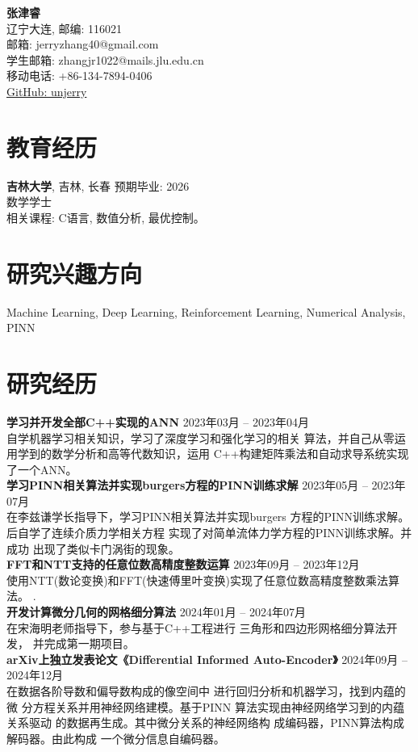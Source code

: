 \documentclass[a4paper,10pt]{article}
\begin{document}
\begin{center}
      {\LARGE \textbf{张津睿}}\\
      辽宁大连, 邮编: 116021 \\
      邮箱: jerryzhang40@gmail.com \\
      学生邮箱: zhangjr1022@mails.jlu.edu.cn \\
      移动电话: +86-134-7894-0406 \\
      \href{https://github.com/unjerry}{GitHub: unjerry}
\end{center}

\section*{教育经历}
\textbf{吉林大学}, 吉林, 长春  \hfill 预期毕业: 2026  \\
数学学士 \\
相关课程: C语言, 数值分析, 最优控制。

\section*{研究兴趣方向}
Machine Learning, Deep Learning, Reinforcement Learning, Numerical Analysis, PINN \\


\section*{研究经历}
\textbf{学习并开发全部C++实现的ANN}
\hfill 2023年03月 – 2023年04月\\
自学机器学习相关知识，学习了深度学习和强化学习的相关
算法，并自己从零运用学到的数学分析和高等代数知识，运用
C++构建矩阵乘法和自动求导系统实现了一个ANN\cite{firstApproachANN}。
\\
\textbf{学习PINN相关算法并实现burgers方程的PINN训练求解}
\hfill 2023年05月 – 2023年07月\\
在李兹谦学长指导下，学习PINN相关算法并实现burgers
方程的PINN训练求解\cite[PINNwork2]{PINNwork2}。后自学了连续介质力学相关方程
实现了对简单流体力学方程的PINN训练求解。并成功
出现了类似卡门涡街的现象\cite[PINNwork1]{PINNwork1}。
\\
\textbf{FFT和NTT支持的任意位数高精度整数运算}
\hfill 2023年09月 – 2023年12月\\
使用NTT(数论变换)和FFT(快速傅里叶变换)实现了任意位数高精度整数乘法算法。
\cite{NTT_ingeterfastmultiplication}.
\\
\textbf{开发计算微分几何的网格细分算法}
\hfill 2024年01月 – 2024年07月\\
在宋海明老师指导下，参与基于C++工程进行
三角形和四边形网格细分算法开发，
并完成第一期项目。
\\
\textbf{arXiv上独立发表论文《Differential Informed Auto-Encoder》}
\hfill 2024年09月 – 2024年12月\\
在数据各阶导数和偏导数构成的像空间中
进行回归分析和机器学习，找到内蕴的微
分方程关系并用神经网络建模。基于PINN
算法实现由神经网络学习到的内蕴关系驱动
的数据再生成。其中微分关系的神经网络构
成编码器，PINN算法构成解码器。由此构成
一个微分信息自编码器。
\cite{zhang2024differentialinformedautoencoder}
\end{document}
